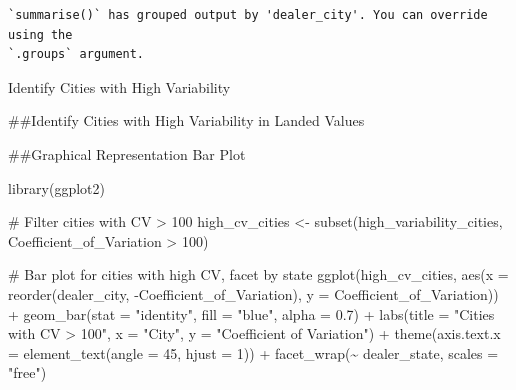 \documentclass[
  letterpaper,
  DIV=11,
  numbers=noendperiod]{scrartcl}
\newenvironment{Shaded}{\begin{snugshade}}{\end{snugshade}}
\newcommand{\AttributeTok}[1]{\textcolor[rgb]{0.40,0.45,0.13}{#1}}
\newcommand{\CommentTok}[1]{\textcolor[rgb]{0.37,0.37,0.37}{#1}}
\newcommand{\ConstantTok}[1]{\textcolor[rgb]{0.56,0.35,0.01}{#1}}
\newcommand{\DecValTok}[1]{\textcolor[rgb]{0.68,0.00,0.00}{#1}}
\newcommand{\FloatTok}[1]{\textcolor[rgb]{0.68,0.00,0.00}{#1}}
\newcommand{\FunctionTok}[1]{\textcolor[rgb]{0.28,0.35,0.67}{#1}}
\newcommand{\NormalTok}[1]{\textcolor[rgb]{0.00,0.23,0.31}{#1}}
\newcommand{\OtherTok}[1]{\textcolor[rgb]{0.00,0.23,0.31}{#1}}
\newcommand{\SpecialCharTok}[1]{\textcolor[rgb]{0.37,0.37,0.37}{#1}}
\newcommand{\StringTok}[1]{\textcolor[rgb]{0.13,0.47,0.30}{#1}}
\begin{document}
\begin{verbatim}
`summarise()` has grouped output by 'dealer_city'. You can override using the
`.groups` argument.
\end{verbatim}

Identify Cities with High Variability

\#\#Identify Cities with High Variability in Landed Values

\begin{Shaded}
\end{Shaded}

\#\#Graphical Representation Bar Plot

\begin{Shaded}
\begin{Highlighting}[]
\FunctionTok{library}\NormalTok{(ggplot2)}

\CommentTok{\# Filter cities with CV \textgreater{} 100}
\NormalTok{high\_cv\_cities }\OtherTok{\textless{}{-}} \FunctionTok{subset}\NormalTok{(high\_variability\_cities, Coefficient\_of\_Variation }\SpecialCharTok{\textgreater{}} \DecValTok{100}\NormalTok{)}

\CommentTok{\# Bar plot for cities with high CV, facet by state}
\FunctionTok{ggplot}\NormalTok{(high\_cv\_cities, }\FunctionTok{aes}\NormalTok{(}\AttributeTok{x =} \FunctionTok{reorder}\NormalTok{(dealer\_city, }\SpecialCharTok{{-}}\NormalTok{Coefficient\_of\_Variation), }\AttributeTok{y =}\NormalTok{ Coefficient\_of\_Variation)) }\SpecialCharTok{+}
  \FunctionTok{geom\_bar}\NormalTok{(}\AttributeTok{stat =} \StringTok{"identity"}\NormalTok{, }\AttributeTok{fill =} \StringTok{"blue"}\NormalTok{, }\AttributeTok{alpha =} \FloatTok{0.7}\NormalTok{) }\SpecialCharTok{+}
  \FunctionTok{labs}\NormalTok{(}\AttributeTok{title =} \StringTok{"Cities with CV \textgreater{} 100"}\NormalTok{, }\AttributeTok{x =} \StringTok{"City"}\NormalTok{, }\AttributeTok{y =} \StringTok{"Coefficient of Variation"}\NormalTok{) }\SpecialCharTok{+}
  \FunctionTok{theme}\NormalTok{(}\AttributeTok{axis.text.x =} \FunctionTok{element\_text}\NormalTok{(}\AttributeTok{angle =} \DecValTok{45}\NormalTok{, }\AttributeTok{hjust =} \DecValTok{1}\NormalTok{)) }\SpecialCharTok{+}
  \FunctionTok{facet\_wrap}\NormalTok{(}\SpecialCharTok{\textasciitilde{}}\NormalTok{ dealer\_state, }\AttributeTok{scales =} \StringTok{"free"}\NormalTok{)}
\end{Highlighting}
\end{Shaded}
\end{document}
